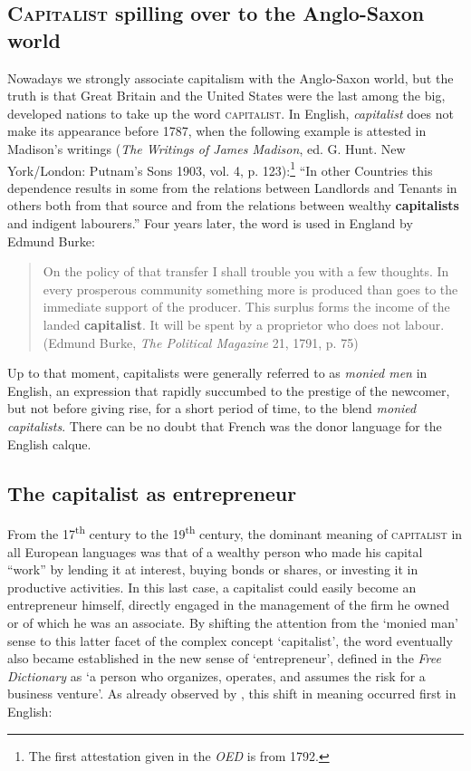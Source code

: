 \documentclass[output=paper]{langsci/langscibook}
\begin{document}
\subsection{\textsc{Capitalist} spilling over to the Anglo-Saxon world}

Nowadays we strongly associate capitalism with the Anglo-Saxon world,
but the truth is that Great Britain and the United States were the last
among the big, developed nations to take up the word \textsc{capitalist}.
In English, \emph{capitalist} does not make its appearance before 1787,
when the following example is attested in Madison's writings (\emph{The
Writings of James Madison}, ed. G. Hunt. New York/London: Putnam's Sons
1903, vol. 4, p. 123):\footnote{The first attestation given in the \emph{OED}
  is from 1792.} ``In other Countries this dependence results in some
from the relations between Landlords and Tenants in others both from
that source and from the relations between wealthy \textbf{capitalists}
and indigent labourers.'' Four years later, the word is used in England
by Edmund Burke:

\begin{quote}
On the policy of that transfer I shall trouble you with a few thoughts.
In every prosperous community something more is produced than goes to
the immediate support of the producer. This surplus forms the income of
the landed \textbf{capitalist}. It will be spent by a proprietor who
does not labour. (Edmund Burke, \emph{The Political Magazine} 21, 1791, p. 75)
\end{quote}

Up to that moment, capitalists were generally referred to as
\emph{monied men} in English, an expression that rapidly succumbed to
the prestige of the newcomer, but not before giving rise, for a short
period of time, to the blend \emph{monied capitalists}. There can be no
doubt that French was the donor language for the English calque.

\subsection{The capitalist as entrepreneur}

From the 17\textsuperscript{th} century to the
19\textsuperscript{th} century, the dominant meaning of
\textsc{capitalist} in all European languages was that of a wealthy
person who made his capital ``work'' by lending it at interest, buying
bonds or shares, or investing it in productive activities. In this last
case, a capitalist could easily become an entrepreneur himself,
directly engaged in the management of the firm he owned or of which he
was an associate. By shifting the attention from the `monied man' sense
to this latter facet of the complex concept `capitalist', the word
eventually also became established  in the new sense of `entrepreneur',
defined in the \emph{Free Dictionary} as `a person who organizes,
operates, and assumes the risk for a business venture'. As already
observed by %
\citet[109--111]{Passow27}%
%
, this shift in meaning  occurred first
in English:
\end{document}
